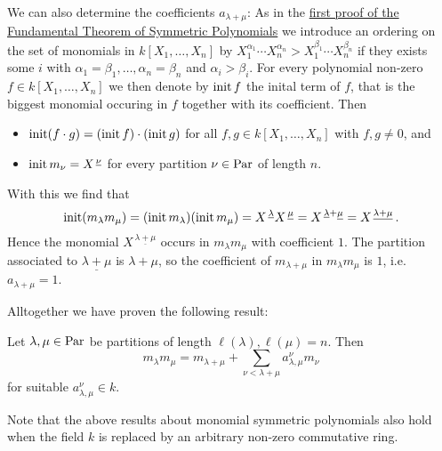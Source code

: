 \begin{fluff}
  We can also determine the coefficients $a_{\lambda + \mu}$:
  As in the \hyperref[label: first proof of fundamental theorem]{first proof of the Fundamental Theorem of Symmetric Polynomials} we introduce an ordering on the set of monomials in $k[X_1, \dotsc, X_n]$ by $X_1^{\alpha_1} \dotsm X_n^{\alpha_n} > X_1^{\beta_1} \dotsm X_n^{\beta_n}$ if they exists some $i$ with $\alpha_1 = \beta_1, \dotsc, \alpha_n = \beta_n$ and $\alpha_i > \beta_i$.
  For every polynomial non-zero $f \in k[X_1, \dotsc, X_n]$ we then denote by $\operatorname{init} f$ the inital term of $f$, that is the biggest monomial occuring in $f$ together with its coefficient.
  Then
  \begin{itemize}
    \item
      $\operatorname{init}(f \cdot g) = (\operatorname{init} f) \cdot (\operatorname{init} g)$ for all $f, g \in k[X_1, \dotsc, X_n]$ with $f, g \neq 0$, and
    \item
      $\operatorname{init} m_\nu = X^{\,\underline{\nu}}$ for every partition $\nu \in \operatorname{Par}$ of length $n$.
  \end{itemize}
  With this we find that
  \[
      \operatorname{init}(m_\lambda m_\mu)
    = (\operatorname{init} m_\lambda) (\operatorname{init} m_\mu)
    = X^{\,\underline{\lambda}} X^{\,\underline{\mu}}
    = X^{\,\underline{\lambda} + \underline{\mu}}
    = X^{\,\underline{\lambda + \mu}} \,.
  \]
  Hence the monomial $X^{\,\underline{\lambda + \mu}}$ occurs in $m_\lambda m_\mu$ with coefficient $1$.
  The partition associated to $\underline{\lambda + \mu}$ is $\lambda + \mu$, so the coefficient of $m_{\lambda + \mu}$ in $m_\lambda m_\mu$ is $1$, i.e.\ $a_{\lambda + \mu} = 1$.
  
  Alltogether we have proven the following result:
\end{fluff}


\begin{lemma}
  Let $\lambda, \mu \in \operatorname{Par}$ be partitions of length $\ell(\lambda), \ell(\mu) = n$.
  Then
  \[
        m_{\lambda} m_{\mu}
    =   m_{\lambda + \mu}
      + \sum_{\nu < \lambda + \mu} a^\nu_{\lambda,\mu} m_\nu
  \]
  for suitable $a^\nu_{\lambda,\mu} \in k$.
\end{lemma}


\begin{remark}
  Note that the above results about monomial symmetric polynomials also hold when the field $k$ is replaced by an arbitrary non-zero commutative ring.
\end{remark}






